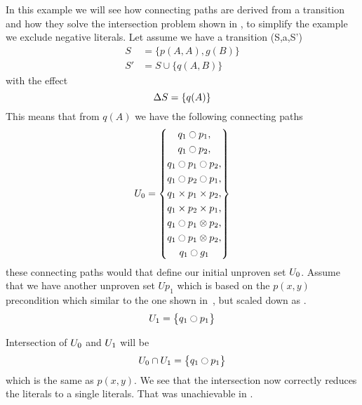 \documentclass[\master/Master.tex]{subfiles}
\begin{document}
\begin{example}\label{ex:ca:non-binding-interesction-model-fixed}
	In this example we will see how connecting paths are derived from a transition and how they solve the intersection problem shown in , to simplify the example we exclude negative literals.
   Let assume we have a transition (S,a,S')
   \begin{align*}
	   	S &= \{ p(A,A), g(B) \}\\
	   	S'& = S \cup \{ q(A,B) \}
   \end{align*}
   with the effect 
	\begin{equation*}
	 	\Delta S = \{ q(A) \}
	\end{equation*}
	This means that from $q(A)$ we have the following connecting paths
	\begin{align*}
		U_0= 
		\left\{
		\begin{gathered}
			q_1 \ocircle p_1
		,\\	q_1 \ocircle p_2
		,\\	q_1 \ocircle p_1 \ocircle p_2
		,\\	q_1 \ocircle p_2 \ocircle p_1
		,\\	q_1 \times p_1 \times p_2 
		,\\	q_1 \times p_2 \times p_1 
		,\\	q_1 \ocircle p_1 \otimes p_2 
		,\\	q_1 \ocircle p_1 \otimes p_2 
		,\\ q_1 \ocircle g_1	
		\end{gathered}	
		\right\}	
	\end{align*}
   these connecting paths would that define our initial unproven set $U_0$.
   Assume that we have another unproven set $Up_1$ which is based on the $p(x,y)$ precondition which similar to the one shown in~, but scaled down as .
   \begin{align*}
   	U_1=
   	\left\{
   	\begin{gathered}
   		 q_1 \ocircle p_1 
   	\end{gathered}	
   	\right\}	
   \end{align*}
   
   Intersection of $U_0$ and $U_1$ will be
	   \begin{align*}
	   	U_0 \cap U_1=
	   	\left\{
	   	\begin{gathered}
	   		q_1 \ocircle p_1 
	   	\end{gathered}	
	   	\right\}	
	   \end{align*}
   which is the same as $p(x,y)$. We see that the intersection now correctly reduces the literals to a single literals.
   That was unachievable in .
   
   
   
   
\end{example}
\end{document}
